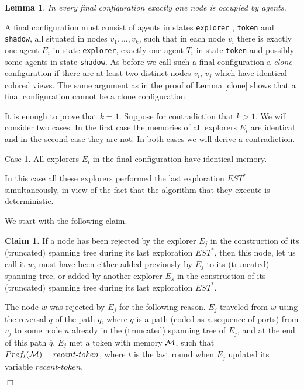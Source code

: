 \documentclass[11pt]{article}
\newtheorem{lemma}{Lemma}[section]
\newcommand{\qed}{\hfill $\Box$ \bigbreak}
\newenvironment{proof}{\noindent {\bf Proof.}}{\qed}
\newcommand{\cM}{{\cal M}}
\begin{document}
    \begin{lemma}\label{cor}
    In every final configuration exactly one node is occupied by agents. 
    \end{lemma}
    
    \begin{proof}
    A final configuration must consist of agents in states  {\tt explorer} , 
{\tt token} and {\tt shadow}, all situated in nodes $v_1, \dots ,v_k$, such that in each node $v_i$ there is exactly one agent $E_i$ in state {\tt explorer}, exactly one
agent $T_i$ in state {\tt token}  and possibly some agents in state  {\tt shadow}. As before we call such a final configuration a {\em clone} 
configuration if there are at least two
distinct nodes $v_i$, $v_j$ which have identical colored views. The same argument as in the proof of Lemma \ref{clone} shows that
a final configuration cannot be a clone configuration. 

It is enough to prove that $k=1$. Suppose for contradiction that $k>1$. We will consider two cases. In the first case the memories of all explorers $E_i$ are
identical and in the second case they are not. In both cases we will derive a contradiction.

 \vspace*{0.2cm}
        \noindent
Case 1. All explorers $E_i$ in the final configuration have identical memory.

In this case all these explorers performed the last exploration $EST^*$ simultaneously, {in view of the fact that the algorithm that they execute is deterministic}.

We start with the following claim.

 \vspace*{0.2cm}
        \noindent
{\bf Claim 1.} {If a node has been rejected by the explorer $E_j$ in the construction of its {(truncated) spanning} tree during its last exploration $EST^*$, then
this node, let us call it $w$, must have been either added previously by $E_j$ to its {(truncated) spanning} tree, or added  by another explorer $E_s$
in the construction of its {(truncated) spanning} tree during its last exploration $EST^*$.} 

The node $w$ was rejected by $E_j$ for the following reason.  $E_j$ 
traveled from $w$ using the reversal $\overline{q}$ of the path $q$, where $q$ is a path (coded as a sequence of ports) from $v_j$ to some node
$u$ already in the {(truncated) spanning} tree of $E_j$, and at the end of this path $\overline{q}$, $E_j$ met a token with memory $\cM$, such that $Pref_t(\cM)=recent\mbox{-}token$,
where $t$ is the last round when $E_j$ updated its variable $recent$-$token$.


\end{proof}
\end{document}
